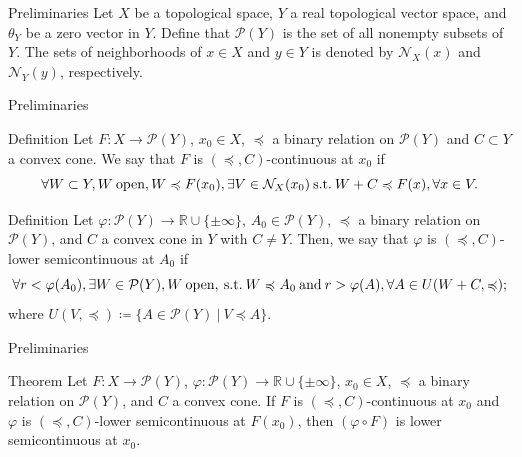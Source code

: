 \documentclass[aspectratio=169, dvipdfmx, 11pt]{beamer}
\newcommand{\RealNumberSet}{\mathbb{R}}
\newcommand{\SuchThat}{\:\text{s.t.}\:}
\newcommand{\SetForm}[2]{
  \{{#1}\:|\:{#2}\}
}
\begin{document}
\begin{frame}{Preliminaries}
  Let $X$ be a topological space, $Y$ a real topological vector space, and $\theta_Y$ be a zero vector in $Y$.
  Define that $\mathcal{P}(Y)$ is the set of all nonempty subsets of $Y$.
  The sets of neighborhoods of $x \in X$ and $y \in Y$ is denoted by $\mathcal{N}_X (x)$ and $\mathcal{N}_Y (y)$, respectively.
\end{frame}


\begin{frame}{Preliminaries}
  \begin{block}{Definition \cite{500001551932}}
    Let $F \colon X \to \mathcal{P}(Y)$, $x_0 \in X$, $\preccurlyeq$ a binary relation on $\mathcal{P}(Y)$
    and $C \subset Y$ a convex cone. We say that $F$ is $(\preccurlyeq, C)$-continuous at $x_0$ if
    \begin{equation}
      \forall W \subset Y, W\:\text{open},W \preccurlyeq F(x_0), \exists V \in \mathcal{N}_{X}(x_0) \SuchThat W + C \preccurlyeq F(x), \forall x \in V. \notag
    \end{equation}
  \end{block}

  \begin{block}{Definition \cite{500001551932}}
    Let $\varphi \colon \mathcal{P}(Y) \to \RealNumberSet \cup \{\pm \infty\}$, $A_0 \in \mathcal{P}(Y)$,
    $\preccurlyeq$ a binary relation on $\mathcal{P}(Y)$, and $C$ a convex cone in $Y$ with $C \ne Y$. Then,
    we say that $\varphi$ is $(\preccurlyeq, C)$-lower semicontinuous at $A_0$ if
    \begin{equation}
      \forall r < \varphi (A_0), \exists W \in \mathcal{P}(Y), W\:\text{open}, \SuchThat W \preccurlyeq A_0 \:\text{and}\:
      r > \varphi (A), \forall A \in U(W + C, \preccurlyeq); \notag
    \end{equation}
    where $U(V,\preccurlyeq) \coloneqq \SetForm{A \in \mathcal{P}(Y)}{V \preccurlyeq A}$.
  \end{block}

\end{frame}

\begin{frame}{Preliminaries}
  \begin{block}{Theorem \cite{500001551932}}
    Let $F \colon X \to \mathcal{P}(Y)$, $\varphi \colon \mathcal{P}(Y) \to \RealNumberSet \cup \{\pm \infty\}$, $x_0 \in X$,
    $\preccurlyeq$ a binary relation on $\mathcal{P}(Y)$, and $C$ a convex cone. If $F$ is $(\preccurlyeq, C)$-continuous at $x_0$
    and $\varphi$ is $(\preccurlyeq, C)$-lower semicontinuous at $F(x_0)$, then $(\varphi \circ F)$ is lower semicontinuous at $x_0$.
  \end{block}
\end{frame}
\end{document}
